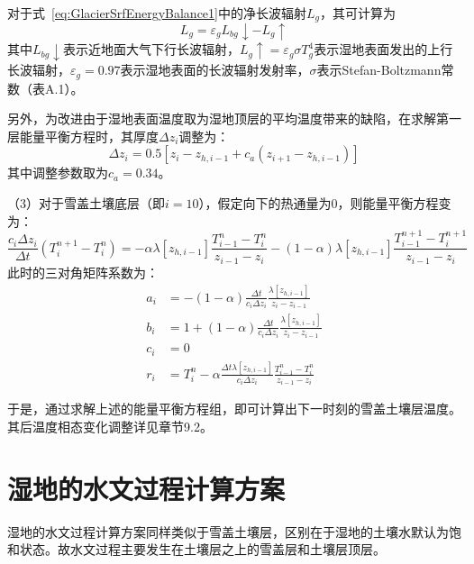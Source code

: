 对于式~\eqref{eq:GlacierSrfEnergyBalance1}中的净长波辐射$L_g$，其可计算为
\begin{equation}
    L_g = \varepsilon_g L_{bg}\downarrow - L_g\uparrow
\end{equation}
其中$L_{bg}\downarrow$表示近地面大气下行长波辐射，$L_g\uparrow=\varepsilon_g\sigma T^4_g$表示湿地表面发出的上行长波辐射，$\varepsilon_g=0.97$表示湿地表面的长波辐射发射率，$\sigma$表示Stefan-Boltzmann常数（表A.1）。

另外，为改进由于湿地表面温度取为湿地顶层的平均温度带来的缺陷，在求解第一层能量平衡方程时，其厚度$\Delta z_i$调整为：
\begin{equation}
    \Delta z_i = 0.5\left[z_i-z_{h,i-1}+c_a\left(z_{i+1}-z_{h,i-1}\right)\right]
\end{equation}
其中调整参数取为$c_a=0.34$。

（3）对于雪盖土壤底层（即$i=10$），假定向下的热通量为0，则能量平衡方程变为：
\begin{equation}
    \frac{c_{i} \Delta z_{i}}{\Delta t}\left(T_{i}^{n+1}-T_{i}^{n}\right)=-\alpha \lambda\left[z_{h, i-1}\right] \frac{T_{i-1}^{n}-T_{i}^{n}}{z_{i-1}-z_{i}}-(1-\alpha) \lambda\left[z_{h, i-1}\right] \frac{T_{i-1}^{n+1}-T_{i}^{n+1}}{z_{i-1}-z_{i}}
\end{equation}
此时的三对角矩阵系数为：
\begin{equation}
\begin{aligned}
a_{i} &= -(1-\alpha) \frac{\Delta t}{c_{i} \Delta z_{i}} \frac{\lambda\left[z_{h, i-1}\right]}{z_{i}-z_{i-1}} \\
b_{i} &= 1+(1-\alpha) \frac{\Delta t}{c_{i} \Delta z_{i}} \frac{\lambda\left[z_{h, i-1}\right]}{z_{i}-z_{i-1}} \\
c_{i} &= 0 \\
r_{i} &= T_{i}^{n}-\alpha \frac{\Delta t \lambda\left[z_{h, i-1}\right]}{c_{i} \Delta z_{i}} \frac{T_{i-1}^{n}-T_{i}^{n}}{z_{i-1}-z_{i}}
\end{aligned}
\end{equation}

于是，通过求解上述的能量平衡方程组，即可计算出下一时刻的雪盖土壤层温度。其后温度相态变化调整详见章节9.2。


\section{湿地的水文过程计算方案}
湿地的水文过程计算方案同样类似于雪盖土壤层，区别在于湿地的土壤水默认为饱和状态。故水文过程主要发生在土壤层之上的雪盖层和土壤层顶层。

